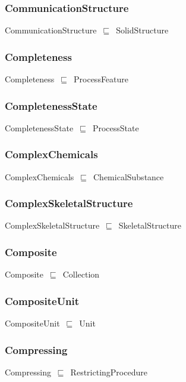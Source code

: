 \documentclass{article}
\begin{document}
\subsubsection*{CommunicationStructure}

CommunicationStructure~\ensuremath{\sqsubseteq}~SolidStructure~

\subsubsection*{Completeness}

Completeness~\ensuremath{\sqsubseteq}~ProcessFeature~

\subsubsection*{CompletenessState}

CompletenessState~\ensuremath{\sqsubseteq}~ProcessState~

\subsubsection*{ComplexChemicals}

ComplexChemicals~\ensuremath{\sqsubseteq}~ChemicalSubstance~

\subsubsection*{ComplexSkeletalStructure}

ComplexSkeletalStructure~\ensuremath{\sqsubseteq}~SkeletalStructure~

\subsubsection*{Composite}

Composite~\ensuremath{\sqsubseteq}~Collection~

\subsubsection*{CompositeUnit}

CompositeUnit~\ensuremath{\sqsubseteq}~Unit~

\subsubsection*{Compressing}

Compressing~\ensuremath{\sqsubseteq}~RestrictingProcedure~
\end{document}
